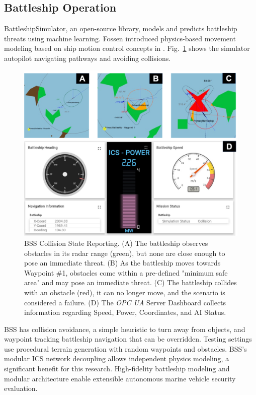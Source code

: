 \documentclass[conference]{IEEEtran}
\begin{document}
\subsection{Battleship Operation}

BattleshipSimulator, an open-source library, models and predicts battleship threats using machine learning. Fossen \cite{b4} introduced physics-based movement modeling based on ship motion control concepts in \cite{b3}. Fig.~\ref{battleship_sim} shows the simulator autopilot navigating pathways and avoiding collisions.

\begin{figure}
    \centering
    \includegraphics[width=1\linewidth]{dashboard_v2.png}
    \caption{BSS Collision State Reporting. (A) The battleship observes obstacles in its radar range (green), but none are close enough to pose an immediate threat. (B) As the battleship moves towards Waypoint \#1, obstacles come within a pre-defined "minimum safe area" and may pose an immediate threat. (C) The battleship collides with an obstacle (red), it can no longer move, and the scenario is considered a failure. (D) The \textit{OPC UA} Server Dashboard collects information regarding Speed, Power, Coordinates, and AI Status.}
    \label{battleship_sim}
\end{figure}


BSS has collision avoidance, a simple heuristic to turn away from objects, and waypoint tracking battleship navigation that can be overridden. Testing settings use procedural terrain generation with random waypoints and obstacles. BSS's modular ICS network decoupling allows independent physics modeling, a significant benefit for this research. High-fidelity battleship modeling and modular architecture enable extensible autonomous marine vehicle security evaluation.
\end{document}
